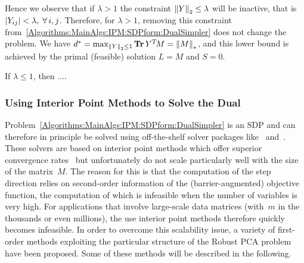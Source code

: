 \documentclass{../../common/projectreport}
\begin{document}
Hence we observe that if $\lambda >1$ the constraint ${\left\|Y\right\|}_{2}^{} \leq \lambda$ will be inactive, that is $|Y_{ij}|<\lambda,\;{\forall \,} i,j$. Therefore, for $\lambda > 1$, removing this constraint from~\eqref{Algorithms:MainAlgs:IPM:SDPform:DualSimpler} does not change the problem. We have $d^* = \max_{{\left\|Y\right\|}_{2}^{}\leq 1} \operatorname{\mathbf{Tr}} Y^T\!M = {\left\|M\right\|}_{*}^{}$, and this lower bound is achieved by the primal (feasible) solution $L=M$ and $S =0$.

If $\lambda \leq 1$, then ....

%
%





\subsubsection{Using Interior Point Methods to Solve the Dual}
\label{Algorithms:MainAlgs:IPM:Complexity:Subsubsec}

Problem~\eqref{Algorithms:MainAlgs:IPM:SDPform:DualSimpler} is an SDP and can therefore in principle be solved using off-the-shelf solver packages like~\cite{Sturm:1999uq} and~\cite{Toh:1999kx}. These solvers are based on interior point methods which offer superior convergence rates~\cite{Boyd:2004aa} but unfortunately do not scale particularly well with the size of the matrix~$M$. The reason for this is that the computation of the step direction relies on second-order information of the (barrier-augmented) objective function, the computation of which is infeasible when the number of variables is very high. For applications that involve large-scale data matrices (with~$m$ in the thousands or even millions), the use interior point methods therefore quickly becomes infeasible. In order to overcome this scalability issue, a variety of first-order methods exploiting the particular structure of the Robust PCA problem have been proposed. Some of these methods will be described in the following.
\end{document}

